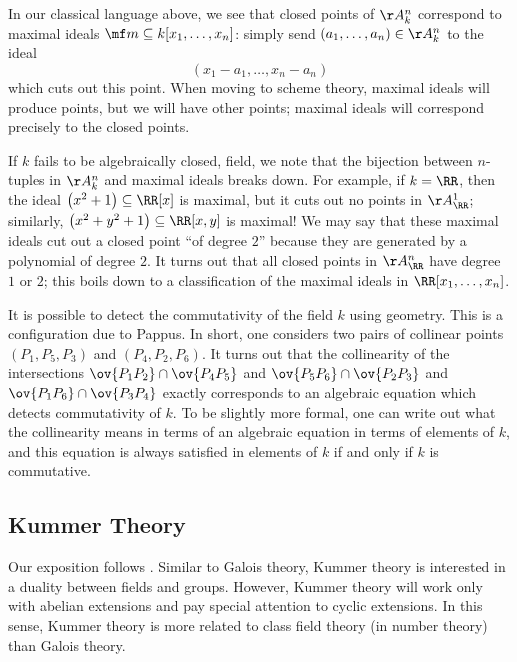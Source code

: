 \documentclass[../notes.tex]{subfiles}
\begin{document}
In our classical language above, we see that closed points of $\AA^n_k$ correspond to maximal ideals $\mf m\subseteq k[x_1,\ldots,x_n]$: simply send $(a_1,\ldots,a_n)\in\AA^n_k$ to the ideal
\[(x_1-a_1,\ldots,x_n-a_n)\]
which cuts out this point. When moving to scheme theory, maximal ideals will produce points, but we will have other points; maximal ideals will correspond precisely to the closed points.
\begin{remark}
	If $k$ fails to be algebraically closed, field, we note that the bijection between $n$-tuples in $\AA^n_k$ and maximal ideals breaks down. For example, if $k=\RR$, then the ideal $\left(x^2+1\right)\subseteq\RR[x]$ is maximal, but it cuts out no points in $\AA^1_\RR$; similarly, $\left(x^2+y^2+1\right)\subseteq\RR[x,y]$ is maximal! We may say that these maximal ideals cut out a closed point ``of degree $2$'' because they are generated by a polynomial of degree $2$. It turns out that all closed points in $\AA^n_\RR$ have degree $1$ or $2$; this boils down to a classification of the maximal ideals in $\RR[x_1,\ldots,x_n]$.
\end{remark}
\begin{remark}[Pappus]
	It is possible to detect the commutativity of the field $k$ using geometry. This is a configuration due to Pappus. In short, one considers two pairs of collinear points $(P_1,P_5,P_3)$ and $(P_4,P_2,P_6)$. It turns out that the collinearity of the intersections $\ov{P_1P_2}\cap \ov{P_4P_5}$ and $\ov{P_5P_6}\cap \ov{P_2P_3}$ and $\ov{P_1P_6}\cap \ov{P_3P_4}$ exactly corresponds to an algebraic equation which detects commutativity of $k$. To be slightly more formal, one can write out what the collinearity means in terms of an algebraic equation in terms of elements of $k$, and this equation is always satisfied in elements of $k$ if and only if $k$ is commutative.
\end{remark}

\subsection{Kummer Theory}
Our exposition follows \cite[Theorems~8.1--8.2]{lang-algebra}. Similar to Galois theory, Kummer theory is interested in a duality between fields and groups. However, Kummer theory will work only with abelian extensions and pay special attention to cyclic extensions. In this sense, Kummer theory is more related to class field theory (in number theory) than Galois theory.
\end{document}
